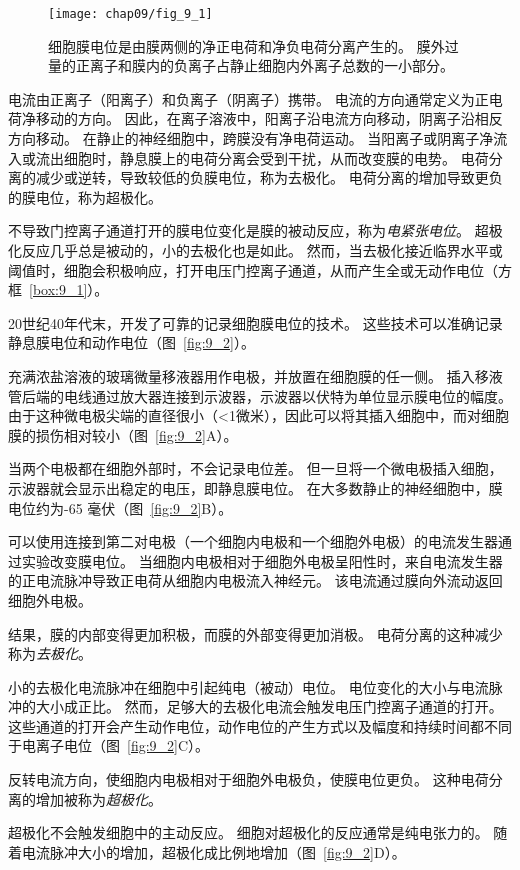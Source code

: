 \begin{figure}[htbp]
	\centering
	\texttt{[image: chap09/fig\_9\_1]}
	\caption{细胞膜电位是由膜两侧的净正电荷和净负电荷分离产生的。
		膜外过量的正离子和膜内的负离子占静止细胞内外离子总数的一小部分。}
	\label{fig:9_1}
\end{figure}


电流由正离子（阳离子）和负离子（阴离子）携带。
电流的方向通常定义为正电荷净移动的方向。
因此，在离子溶液中，阳离子沿电流方向移动，阴离子沿相反方向移动。
在静止的神经细胞中，跨膜没有净电荷运动。
当阳离子或阴离子净流入或流出细胞时，静息膜上的电荷分离会受到干扰，从而改变膜的电势。
电荷分离的减少或逆转，导致较低的负膜电位，称为去极化。
电荷分离的增加导致更负的膜电位，称为超极化。


不导致门控离子通道打开的膜电位变化是膜的被动反应，称为\textit{电紧张电位}。
超极化反应几乎总是被动的，小的去极化也是如此。
然而，当去极化接近临界水平或阈值时，细胞会积极响应，打开电压门控离子通道，从而产生全或无动作电位（方框~\ref{box:9_1}）。


\begin{proposition}[记录膜电位] \label{box:9_1}
	
	\quad \quad 20世纪40年代末，开发了可靠的记录细胞膜电位的技术。
	这些技术可以准确记录静息膜电位和动作电位（图~\ref{fig:9_2}）。
	
	\quad \quad 充满浓盐溶液的玻璃微量移液器用作电极，并放置在细胞膜的任一侧。
	插入移液管后端的电线通过放大器连接到示波器，示波器以伏特为单位显示膜电位的幅度。
	由于这种微电极尖端的直径很小（<1微米），因此可以将其插入细胞中，而对细胞膜的损伤相对较小（图~\ref{fig:9_2}A）。
	
	\quad \quad 当两个电极都在细胞外部时，不会记录电位差。
	但一旦将一个微电极插入细胞，示波器就会显示出稳定的电压，即静息膜电位。
	在大多数静止的神经细胞中，膜电位约为-65 毫伏（图~\ref{fig:9_2}B）。
	
	\quad \quad 可以使用连接到第二对电极（一个细胞内电极和一个细胞外电极）的电流发生器通过实验改变膜电位。
	当细胞内电极相对于细胞外电极呈阳性时，来自电流发生器的正电流脉冲导致正电荷从细胞内电极流入神经元。
	该电流通过膜向外流动返回细胞外电极。
	
	\quad \quad 结果，膜的内部变得更加积极，而膜的外部变得更加消极。
	电荷分离的这种减少称为\textit{去极化}。
	
	\quad \quad 小的去极化电流脉冲在细胞中引起纯电（被动）电位。
	电位变化的大小与电流脉冲的大小成正比。
	然而，足够大的去极化电流会触发电压门控离子通道的打开。
	这些通道的打开会产生动作电位，动作电位的产生方式以及幅度和持续时间都不同于电离子电位（图~\ref{fig:9_2}C）。
	
	\quad \quad 反转电流方向，使细胞内电极相对于细胞外电极负，使膜电位更负。
	这种电荷分离的增加被称为\textit{超极化}。
	
	\quad \quad 超极化不会触发细胞中的主动反应。
	细胞对超极化的反应通常是纯电张力的。
	随着电流脉冲大小的增加，超极化成比例地增加（图~\ref{fig:9_2}D）。

	
\end{proposition}



